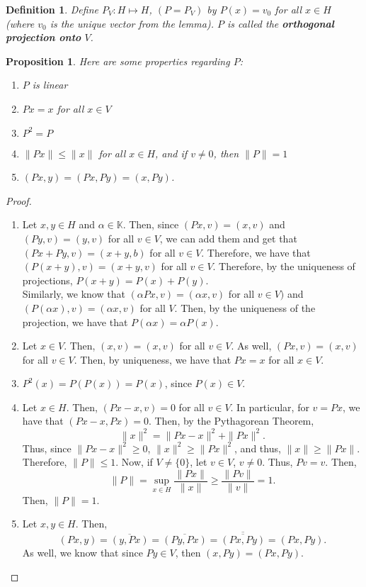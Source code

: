 \documentclass[12pt]{article}
\newtheorem{definition}{Definition}
\newtheorem{proposition}{Proposition}
\def\K{\mathbb{K}}
\newcommand{\ov}{\overline}
\begin{document}
\begin{definition}
Define $P_V: H \mapsto H$, $(P = P_V)$ by $P(x) = v_0$ for all $x \in H$ (where $v_0$ is the unique vector from the lemma). $P$ is called the \textbf{orthogonal projection onto} $V$. 
\end{definition}
\begin{proposition}
Here are some properties regarding $P$:
\begin{enumerate}[topsep=-15pt, itemsep=0pt]
\item[(i)] $P$ is linear
\item[(ii)] $Px = x$ for all $x \in V$
\item[(iii)] $P^2 = P$
\item[(iv)] $\| P x \| \leq \| x \|$ for all $x \in H$, and if $v \neq 0$, then $\| P \| = 1$
\item[(v)] $(Px, y) = (Px, Py) = (x, Py)$. 
\end{enumerate}
\end{proposition}
\vspace{-25pt}
\begin{proof}
\begin{enumerate}
\item[(i)] Let $x, y \in H$ and $\alpha \in \K$. Then, since $(Px, v) = (x, v)$ and $(Py, v) = (y, v)$ for all $v \in V$, we can add them and get that $(Px + Py, v) = (x + y, b)$ for all $v \in V$. Therefore, we have that $(P(x + y), v) = (x + y, v)$ for all $v \in V$. Therefore, by the uniqueness of projections, $P(x + y) = P(x) + P(y)$. \\
\indent Similarly, we know that $(\alpha Px, v) = (\alpha x, v)$ for all $v \in V)$ and $(P(\alpha x), v) = (\alpha x, v)$ for all $V$. Then, by the uniqueness of the projection, we have that $P(\alpha x) = \alpha P(x)$. \\
\item[(ii)] Let $x \in V$. Then, $(x, v) = (x, v)$ for all $v \in V$. As well, $(Px, v) = (x, v)$ for all $v \in V$. Then, by uniqueness, we have that $Px = x$ for all $x \in V$. 
\item[(iii)] $P^2(x) = P(P(x)) = P(x)$, since $P(x) \in V$. 
\item[(iv)] Let $x \in H$. Then, $(Px - x, v) = 0$ for all $v \in V$. In particular, for $v = Px$, we have that $(Px - x, Px) = 0$. Then, by the Pythagorean Theorem,
\[ \| x\|^2 = \| Px - x \|^2 + \| Px \|^2.\]
Thus, since $\| Px - x \|^2 \geq 0$, $\| x \|^2 \geq \| Px \|^2$, and thus, $\| x \| \geq \| P x\|$. Therefore, $\| P \| \leq 1$. Now, if $V \neq \{ 0 \}$, let $v \in V$, $v \neq 0$. Thus, $Pv = v$. Then, 
\[ \| P \| = \sup\limits_{x \in H} \frac{\| Px \|}{\| x\|} \geq \frac{\| Pv \|}{\| v \|} = 1.\] 
Then, $\| P \| = 1$. 
\item[(v)] Let $x, y \in H$. Then, 
\[ (Px, y) = \ov{(y, Px)} = \ov{(Py, Px)} = \ov{\ov{(Px, Py)}} = (Px, Py).\]
As well, we know that since $Py \in V$, then $(x, Py) = (Px, Py)$. 
\end{enumerate}
\end{proof}
\end{document}

